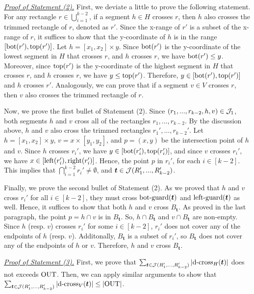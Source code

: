 

\noindent \underline{\em Proof of Statement (2).} 
First, we deviate a little to prove the following statement. For any rectangle $r\in \bigcup_{i = 1}^{k-2}$, if a segment $h\in H$ crosses $r$, then $h$ also crosses the trimmed rectangle of $r$, denoted as $r'$. Since the x-range of $r'$ is a subset of the x-range of $r$, it suffices to show that the y-coordinate of $h$ is in the range $[\mathrm{bot}(r'), \mathrm{top}(r')]$. Let $h = [x_1,x_2]\times y$. Since $\mathrm{bot}(r')$ is the y-coordinate of the lowest segment in $H$ that crosses $r$, and $h$ crosses $r$, we have $\mathrm{bot}(r') \leq y$. Moreover, since $\mathrm{top}(r')$ is the y-coordinate of the highest segment in $H$ that crosses $r$, and $h$ crosses $r$, we have $y \leq \mathrm{top}(r')$. Therefore, $y \in [\mathrm{bot}(r'), \mathrm{top}(r')]$ and $h$ crosses $r'$.  Analogously, we can prove that if a segment $v\in V$ crosses $r$, then $v$ also crosses the trimmed rectangle of $r$.

\vgap

Now, we prove the first bullet of Statement (2). Since $(r_1,...,r_{k-2},h,v)\in \mathcal{J}_1$, both segments $h$ and $v$ cross all of the rectangles $r_1,..., r_{k-2}$. By the discussion above, $h$ and $v$ also cross the trimmed rectangles $r_1',..., r_{k-2}'$. Let $h = [x_1,x_2]\times y$, $v = x \times [y_1,y_2]$, and $p = (x,y)$ be the intersection point of $h$ and $v$. 
Since $h$ crosses $r_i'$, we have $y \in [\mathrm{bot}(r_i'), \mathrm{top}(r_i')]$, and since $v$ crosses $r_i'$, we have $x \in [\mathrm{left}(r_i'), \mathrm{right}(r_i')]$. Hence, the point $p$ in $r_i'$, for each $i \in [k-2]$. This implies that $\bigcap_{i = 1}^{k-2}r_i' \neq \emptyset$, and $\textrm{\boldmath${t}$}\in \mathcal{J}(R_1',...,R_{k-2}')$. 

\vgap 

Finally, we prove the second bullet of Statement (2). As we proved that $h$ and $v$ cross $r_i'$ for all $i \in [k-2]$, they must cross $\mathrm{bot\text{-}guard}(\textrm{\boldmath${t}$})$ and $\mathrm{left\text{-}guard}(\textrm{\boldmath${t}$})$ as well. Hence, it suffices to show that both $h$ and $v$ cross $B_\bm{t}$. As proved in the last paragraph, the point $p = h \cap v$ is in $B_\bm{t}$. So, $h\cap B_\bm{t}$ and $v \cap B_\bm{t}$ are non-empty. Since $h$ (resp. $v$) crosses $r_i'$ for some $i \in [k-2]$, $r_i'$ does not cover any of the endpoints of $h$ (resp. $v$). Additonally, $B_\bm{t}$ is a subset of $r_i'$, so $B_\bm{t}$ does not cover any of the endpoints of $h$ or $v$. Therefore, $h$ and $v$ cross $B_\bm{t}$. 

\vgap 


\noindent \underline{\em Proof of Statement (3).}  First, we prove that $\sum_{\textrm{\boldmath${t}$}\in \mathcal{J}(R_1',...,R_{k-2}')}  |\mathrm{d\text{-}cross}_H(\textrm{\boldmath${t}$})|$ does not exceeds $\mathrm{OUT}$. Then, we can apply similar arguments to show that $\sum_{\textrm{\boldmath${t}$}\in \mathcal{J}(R_1',...,R_{k-2}')}  |\mathrm{d\text{-}cross}_V(\textrm{\boldmath${t}$})| \leq |\mathrm{OUT}|$. 
 
